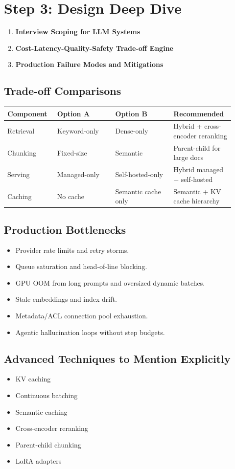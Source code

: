 \section*{Step 3: Design Deep Dive}
\begin{enumerate}
  \item \textbf{Interview Scoping for LLM Systems}
  \item \textbf{Cost-Latency-Quality-Safety Trade-off Engine}
  \item \textbf{Production Failure Modes and Mitigations}
\end{enumerate}

\subsection*{Trade-off Comparisons}
\begin{tabular}{|p{0.2\linewidth}|p{0.24\linewidth}|p{0.24\linewidth}|p{0.24\linewidth}|}
\hline
\textbf{Component} & \textbf{Option A} & \textbf{Option B} & \textbf{Recommended} \\
\hline
Retrieval & Keyword-only & Dense-only & Hybrid + cross-encoder reranking \\
\hline
Chunking & Fixed-size & Semantic & Parent-child for large docs \\
\hline
Serving & Managed-only & Self-hosted-only & Hybrid managed + self-hosted \\
\hline
Caching & No cache & Semantic cache only & Semantic + KV cache hierarchy \\
\hline
\end{tabular}

\subsection*{Production Bottlenecks}
\begin{itemize}
  \item Provider rate limits and retry storms.
  \item Queue saturation and head-of-line blocking.
  \item GPU OOM from long prompts and oversized dynamic batches.
  \item Stale embeddings and index drift.
  \item Metadata/ACL connection pool exhaustion.
  \item Agentic hallucination loops without step budgets.
\end{itemize}

\subsection*{Advanced Techniques to Mention Explicitly}
\begin{itemize}
  \item KV caching
  \item Continuous batching
  \item Semantic caching
  \item Cross-encoder reranking
  \item Parent-child chunking
  \item LoRA adapters
\end{itemize}

